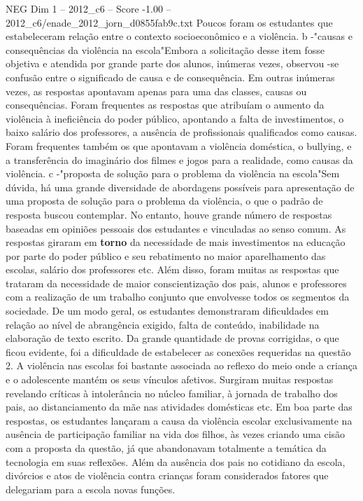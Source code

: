 \begin{textsample}{NEG Dim 1 – 2012\_c6 – Score -1.00 – 2012\_c6/enade\_2012\_jorn\_d0855fab9c.txt}
Poucos foram os estudantes que estabeleceram relação entre o contexto socioeconômico e a violência. b -"causas e consequências da violência na escola"Embora a solicitação desse item fosse objetiva e atendida por grande parte dos alunos, inúmeras vezes, observou -se confusão entre o significado de causa e de consequência.
Em outras inúmeras vezes, as respostas apontavam apenas para uma das classes, causas ou consequências.
Foram frequentes as respostas que atribuíam o aumento da violência à ineficiência do poder público, apontando a falta de investimentos, o baixo salário dos professores, a ausência de profissionais qualificados como causas.
Foram frequentes também os que apontavam a violência doméstica, o bullying, e a transferência do imaginário dos filmes e jogos para a realidade, como causas da violência. c -"proposta de solução para o problema da violência na escola"Sem dúvida, há uma grande diversidade de abordagens possíveis para apresentação de uma proposta de solução para o problema da violência, o que o padrão de resposta buscou contemplar.
No entanto, houve grande número de respostas baseadas em opiniões pessoais dos estudantes e vinculadas ao senso comum.
As respostas giraram em \textbf{torno} da necessidade de mais investimentos na educação por parte do poder público e seu rebatimento no maior aparelhamento das escolas, salário dos professores etc.
Além disso, foram muitas as respostas que trataram da necessidade de maior conscientização dos pais, alunos e professores com a realização de um trabalho conjunto que envolvesse todos os segmentos da sociedade.
De um modo geral, os estudantes demonstraram dificuldades em relação ao nível de abrangência exigido, falta de conteúdo, inabilidade na elaboração de texto escrito.
Da grande quantidade de provas corrigidas, o que ficou evidente, foi a dificuldade de estabelecer as conexões requeridas na questão 2.
A violência nas escolas foi bastante associada ao reflexo do meio onde a criança e o adolescente mantém os seus vínculos afetivos.
Surgiram muitas respostas revelando críticas à intolerância no núcleo familiar, à jornada de trabalho dos pais, ao distanciamento da mãe nas atividades domésticas etc.
Em boa parte das respostas, os estudantes lançaram a causa da violência escolar exclusivamente na ausência de participação familiar na vida dos filhos, às vezes criando uma cisão com a proposta da questão, já que abandonavam totalmente a temática da tecnologia em suas reflexões.
Além da ausência dos pais no cotidiano da escola, divórcios e atos de violência contra crianças foram considerados fatores que delegariam para a escola novas funções.

\end{textsample}
